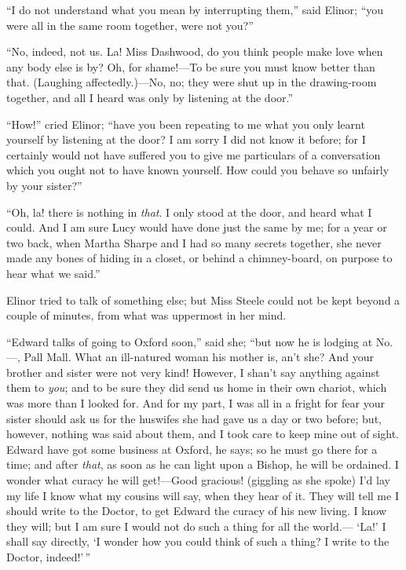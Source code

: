 \documentclass{article}
\begin{document}
``I do not understand what you mean by interrupting them,''
said Elinor; ``you were all in the same room together,
were not you?''

``No, indeed, not us.  La! Miss Dashwood, do you
think people make love when any body else is by?  Oh,
for shame!---To be sure you must know better than that.
(Laughing affectedly.)---No, no; they were shut up in the
drawing-room together, and all I heard was only by listening
at the door.''

``How!'' cried Elinor; ``have you been repeating to me
what you only learnt yourself by listening at the door?
I am sorry I did not know it before; for I certainly
would not have suffered you to give me particulars of a
conversation which you ought not to have known yourself.
How could you behave so unfairly by your sister?''

``Oh, la! there is nothing in \emph{that}.  I only stood at
the door, and heard what I could.  And I am sure Lucy would
have done just the same by me; for a year or two back,
when Martha Sharpe and I had so many secrets together,
she never made any bones of hiding in a closet, or behind
a chimney-board, on purpose to hear what we said.''

Elinor tried to talk of something else; but Miss
Steele could not be kept beyond a couple of minutes,
from what was uppermost in her mind.

``Edward talks of going to Oxford soon,'' said she;
``but now he is lodging at No. ---, Pall Mall.  What an
ill-natured woman his mother is, an't she? And your
brother and sister were not very kind! However,
I shan't say anything against them to \emph{you}; and to be sure
they did send us home in their own chariot, which
was more than I looked for.  And for my part, I was all
in a fright for fear your sister should ask us for the
huswifes she had gave us a day or two before; but, however,
nothing was said about them, and I took care to keep mine
out of sight.  Edward have got some business at Oxford,
he says; so he must go there for a time; and after \emph{that},
as soon as he can light upon a Bishop, he will be ordained.
I wonder what curacy he will get!---Good gracious!
(giggling as she spoke) I'd lay my life I know what
my cousins will say, when they hear of it.  They will
tell me I should write to the Doctor, to get Edward
the curacy of his new living.  I know they will; but I am
sure I would not do such a thing for all the world.---%
`La!' I shall say directly, `I wonder how you could think
of such a thing?  I write to the Doctor, indeed!'\,''
\end{document}
